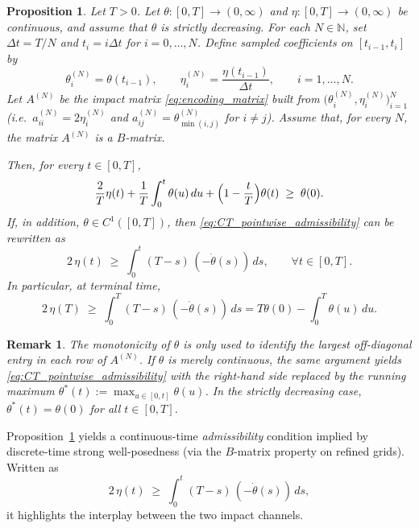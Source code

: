 \documentclass[final,3p,authoryear,12pt]{elsarticle}
\newtheorem{remark}{Remark}
\newtheorem{proposition}{Proposition}
\begin{document}
\begin{proposition}
\label{prop:CT_from_Bmatrix}
Let $T>0$. Let $\theta:[0,T]\to(0,\infty)$ and $\eta:[0,T]\to(0,\infty)$ be
continuous, and assume that $\theta$ is strictly decreasing. For each
$N\in\mathbb{N}$, set
$\Delta t=T/N$ and $t_i=i\Delta t$ for $i=0,\dots,N$.
Define sampled coefficients on $[t_{i-1},t_i]$ by
\[
\theta_i^{(N)}=\theta(t_{i-1}),\qquad
\eta_i^{(N)}=\frac{\eta(t_{i-1})}{\Delta t},
\qquad i=1,\dots,N.
\]
Let $A^{(N)}$ be the impact matrix \eqref{eq:encoding_matrix} built from
$\bigl(\theta_i^{(N)},\eta_i^{(N)}\bigr)_{i=1}^N$ (i.e.\ $a^{(N)}_{ii}=2\eta_i^{(N)}$
and $a^{(N)}_{ij}=\theta_{\min(i,j)}^{(N)}$ for $i\neq j$).
Assume that, for every $N$, the matrix $A^{(N)}$ is a $B$-matrix.

Then, for every $t\in[0,T]$,
\begin{equation}
\label{eq:CT_pointwise_admissibility}
\frac{2}{T}\eta(t)
+\frac{1}{T}\int_{0}^{t}\theta(u)\,du
+\Bigl(1-\frac{t}{T}\Bigr)\theta(t)
\;\ge\;\theta(0).
\end{equation}
If, in addition, $\theta\in C^{1}([0,T])$, then
\eqref{eq:CT_pointwise_admissibility} can be rewritten as
\begin{equation}
\label{eq:CT_weighted_slope}
2\,\eta(t)\;\ge\;\int_{0}^{t}(T-s)\,(-\dot\theta(s))\,ds,
\qquad \forall t\in[0,T].
\end{equation}
In particular, at terminal time,
\begin{equation}
\label{eq:CT_terminal_condition}
2\,\eta(T)\;\ge\;\int_{0}^{T}(T-s)\,(-\dot\theta(s))\,ds
= T\theta(0)-\int_{0}^{T}\theta(u)\,du.
\end{equation}
\end{proposition}

\begin{remark}
\label{remark:CT_from_Bmatrix_nonmonotone}
The monotonicity of $\theta$ is only used to identify the largest
off-diagonal entry in each row of $A^{(N)}$. If $\theta$ is merely continuous,
the same argument yields \eqref{eq:CT_pointwise_admissibility} with the
right-hand side replaced by the running maximum
$\theta^{\ast}(t):=\max_{u\in[0,t]}\theta(u)$. In the strictly decreasing case,
$\theta^{\ast}(t)=\theta(0)$ for all $t\in[0,T]$.
\end{remark}



Proposition~\ref{prop:CT_from_Bmatrix} yields a continuous-time
\emph{admissibility} condition implied by discrete-time strong
well-posedness (via the $B$-matrix property on refined grids).
Written as
\[
2\,\eta(t)\;\ge\;\int_{0}^{t}(T-s)\,(-\dot\theta(s))\,ds,
\]
it highlights the interplay between the two impact channels.
\end{document}
